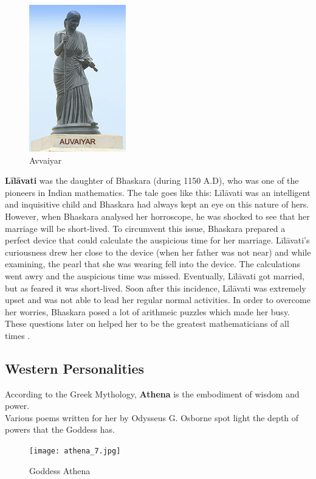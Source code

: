 \documentclass[a4paper,10pt]{article}
\begin{document}
\begin{center}
\begin{figure}[h]
\centering
 \includegraphics[scale=0.6]{avvaiyar.jpg}
 \caption{Avvaiyar}
\end{figure}
\end{center}

\textbf{L\={i}l\={a}vati} was the daughter of Bhaskara (during 1150 A.D), who was one of the pioneers in Indian mathematics. The tale goes like this: L\={i}l\={a}vati was an intelligent and inquisitive child and Bhaskara had always kept an eye on this nature of hers. However, when Bhaskara analysed her horroscope, he was shocked to see that her marriage will be short-lived. To circumvent this issue, Bhaskara prepared a perfect device that could calculate the auspicious time for her marriage. L\={i}l\={a}vati's curiousness drew her close to the device (when her father was not near) and while examining, the pearl that she was wearing fell into the device. The calculations went awry and the auspicious time was missed. Eventually, L\={i}l\={a}vati got married, but as feared it was short-lived. Soon after this incidence, L\={i}l\={a}vati was extremely upset and was not able to lead her regular normal activities. In order to overcome her worries, Bhaskara posed a lot of arithmeic puzzles which made her busy. These questions later on helped her to be the 
greatest mathematicians of all times \cite{lilavati}. 

\subsection{Western Personalities}
\newblock
According to the Greek Mythology, \textbf{Athena} is the embodiment of wisdom and power.\\
Various poems written for her by Odysseus G. Osborne spot light the depth of powers that the Goddess has.\\
\begin{center}
\begin{figure}[h]
\centering
 \texttt{[image: athena\_7.jpg]}
 \caption{Goddess Athena}
\end{figure}
\end{center}
\end{document}
